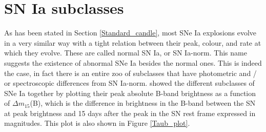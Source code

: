 \documentclass[a4paper,oneside,12pt, class=Latex/Classes/PhDthesisPSnPDF, crop=false]{standalone}
\begin{document}
\section{SN Ia subclasses}
As has been stated in Section \ref{Standard_candle}, most SNe Ia explosions evolve in a very similar way with a tight relation between their peak, colour, and rate at which they evolve. These are called normal SN Ia, or SN Ia-norm. This name suggests the existence of abnormal SNe Ia besides the normal ones. This is indeed the case, in fact there is an entire zoo of subclasses that have photometric and / or spectroscopic differences from SN Ia-norm. \citet{Taubenberger_plot} showed the different subclasses of SNe Ia together by plotting their peak absolute B-band brightness as a function of $\Delta m_{15}$(B), which is the difference in brightness in the B-band between the SN at peak brightness and 15 days after the peak in the SN rest frame expressed in magnitudes. This plot is also shown in Figure \ref{Taub_plot}.
\end{document}
